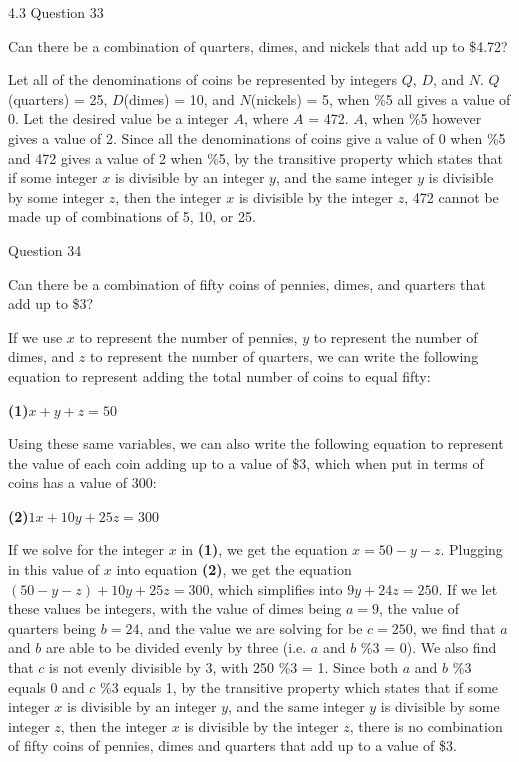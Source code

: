 \documentclass{article}
\author{Joshua Harthan}
\begin{document}
4.3 Question 33
\item[]Can there be a combination of quarters, dimes, and nickels that add up to \$4.72? 
\item[]Let all of the denominations of coins be represented by integers $Q$, $D$, and $N$. $Q$(quarters) = 25, $D$(dimes) = 10, and $N$(nickels) = 5, when \%5 all gives a value of 0. Let the desired value be a integer $A$, where $A$ = 472.  $A$, when \%5 however gives a value of 2. Since all the denominations of coins give a value of 0 when \%5 and 472 gives a value of 2 when \%5, by the transitive property which states that if some integer $x$ is divisible by an integer $y$, and the same integer $y$ is divisible by some integer $z$, then the integer $x$ is divisible by the integer $z$, 472 cannot be made up of combinations of 5, 10, or 25.

\clearpage
{} Question 34
\item[]Can there be a combination of fifty coins of pennies, dimes, and quarters that add up to \$3?
\item[]If we use $x$ to represent the number of pennies, $y$ to represent the number of dimes, and $z$ to represent the number of quarters, we can write the following equation to represent adding the total number of coins to equal fifty:
\item[]\textbf{(1)}$ x + y + z = 50 $         
\item[]Using these same variables, we can also write the following equation to represent the value of each coin adding up to a value of \$3, which when put in terms of coins has a value of 300:
\item[]\textbf{(2)}$ 1x + 10y + 25z = 300 $
\item[] If we solve for the integer $x$ in \textbf{(1)}, we get the equation $x = 50 - y - z$. Plugging in this value of $x$ into equation \textbf{(2)}, we get the equation $(50 - y - z) + 10y + 25z = 300$, which simplifies into $9y + 24z = 250$. If we let these values be integers, with the value of dimes being $a = 9$, the value of quarters being $b = 24$, and the value we are solving for be $c = 250$, we find that $a$ and $b$ are able to be divided evenly by three (i.e. $a$ and $b$ \%3 = 0). We also find that $c$ is not evenly divisible by 3, with 250 \%3 = 1. Since both $a$ and $b$ \%3 equals 0 and $c$ \%3 equals 1, by the transitive property which states that if some integer $x$ is divisible by an integer $y$, and the same integer $y$ is divisible by some integer $z$, then the integer $x$ is divisible by the integer $z$, there is no combination of fifty coins of pennies, dimes and quarters that add up to a value of \$3.
\end{document}
